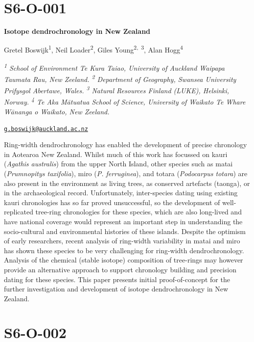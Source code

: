 \documentclass[
]{book}
\begin{document}
\hypertarget{s6-o-001}{%
\section*{S6-O-001}\label{s6-o-001}}

\textbf{Isotope dendrochronology in New Zealand}

Gretel Boswijk\textsuperscript{1}, Neil Loader\textsuperscript{2}, Giles Young\textsuperscript{2,~3}, Alan Hogg\textsuperscript{4}

\emph{\textsuperscript{1} School of Environment Te Kura Taiao, University of Auckland Waipapa Taumata Rau, New Zeeland. \textsuperscript{2} Department of Geography, Swansea University Prifysgol Abertawe, Wales. \textsuperscript{3} Natural Resources Finland (LUKE), Helsinki, Norway. \textsuperscript{4} Te Aka Mātuatua School of Science, University of Waikato Te Whare Wānanga o Waikato, New Zeeland.}

\href{mailto:g.boswijk@auckland.ac.nz}{\nolinkurl{g.boswijk@auckland.ac.nz}}

Ring-width dendrochronology has enabled the development of precise chronology in Aotearoa New Zealand. Whilst much of this work has focussed on kauri (\emph{Agathis australis}) from the upper North Island, other species such as matai (\emph{Prumnopitys taxifolia}), miro (\emph{P. ferruginea}), and totara (\emph{Podocarpus totara}) are also present in the environment as living trees, as conserved artefacts (taonga), or in the archaeological record. Unfortunately, inter-species dating using existing kauri chronologies has so far proved unsuccessful, so the development of well-replicated tree-ring chronologies for these species, which are also long-lived and have national coverage would represent an important step in understanding the socio-cultural and environmental histories of these islands. Despite the optimism of early researchers, recent analysis of ring-width variability in matai and miro has shown these species to be very challenging for ring-width dendrochronology. Analysis of the chemical (stable isotope) composition of tree-rings may however provide an alternative approach to support chronology building and precision dating for these species. This paper presents initial proof-of-concept for the further investigation and development of isotope dendrochronology in New Zealand.

\hypertarget{s6-o-002}{%
\section*{S6-O-002}\label{s6-o-002}}
\end{document}
